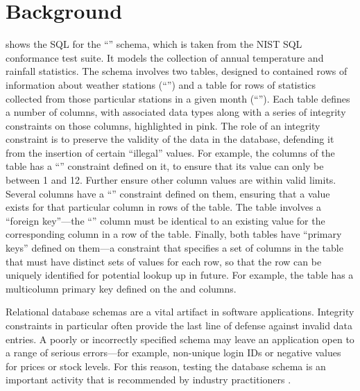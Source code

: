 
\section{Background}
\label{sec:background}



 shows the SQL for the ``\NistWeather'' schema, which is taken from the NIST SQL conformance test suite. It models the collection of annual temperature and rainfall statistics. The schema involves two tables, designed to contained rows of information about weather stations (``'') and a table for rows of statistics collected from those particular stations in a given month (``''). Each table defines a number of columns, with associated data types along with a series of integrity constraints on those columns, highlighted in pink. The role of an integrity constraint is to preserve the validity of the data in the database, defending it from the insertion of certain ``illegal'' values. For example, the  columns of the  table has a ``\CHECK'' constraint defined on it, to ensure that its value can only be between 1 and 12. Further \CCs ensure other column values are within valid limits. Several columns have a ``\NOTNULL'' constraint defined on them, ensuring that a value exists for that particular column in rows of the table. The  table involves a ``foreign key''---the ``'' column must be identical to an existing value for the corresponding  column in a row of the  table. Finally, both tables have ``primary keys'' defined on them---a constraint that specifies a set of columns in the table that must have distinct sets of values for each row, so that the row can be uniquely identified for potential lookup up in future. For example, the  table has a multicolumn primary key defined on the  and  columns.

Relational database schemas are a vital artifact in software applications. Integrity constraints in particular often provide the last line of defense against invalid data entries. A poorly or incorrectly specified schema may leave an application open to a range of serious errors---for example, non-unique login IDs or negative values for prices or stock levels. For this reason, testing the database schema is an important activity that is recommended by industry practitioners \cite{DzoneDatabaseTesting}.

